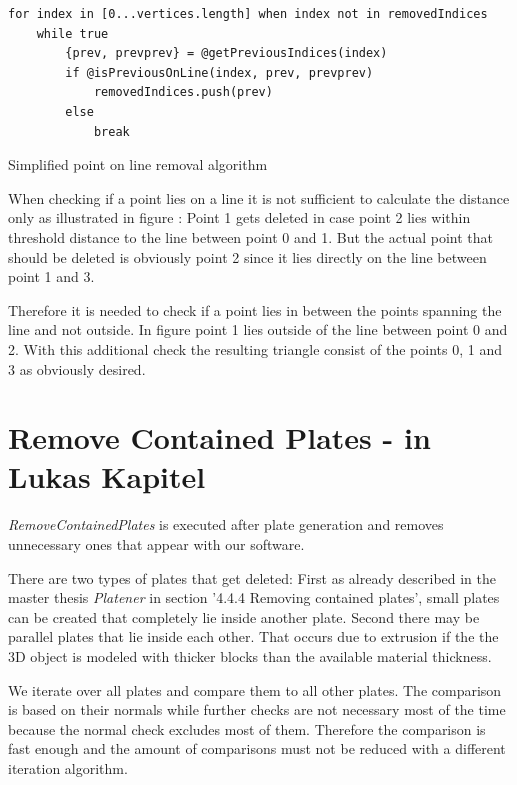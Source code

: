 \documentclass[../ClassicThesis.tex]{subfiles}
\begin{document}
\begin{listing}[!h]
\centering
\begin{verbatim}
for index in [0...vertices.length] when index not in removedIndices
    while true
        {prev, prevprev} = @getPreviousIndices(index)
        if @isPreviousOnLine(index, prev, prevprev)
            removedIndices.push(prev)
        else
            break
\end{verbatim}
\caption{Simplified point on line removal algorithm}
\label{lst:pointOnLineRemovalAlgo}
\end{listing}


When checking if a point lies on a line it is not sufficient to calculate the distance only as illustrated in figure : Point 1 gets deleted in case point 2 lies within threshold distance to the line between point 0 and 1. But the actual point that should be deleted is obviously point 2 since it lies directly on the line between point 1 and 3.

Therefore it is needed to check if a point lies in between the points spanning the line and not outside. In figure  point 1 lies outside of the line between point 0 and 2. With this additional check the resulting triangle consist of the points 0, 1 and 3 as obviously desired.










\section{Remove Contained Plates - in Lukas Kapitel}

\emph{RemoveContainedPlates} is executed after plate generation and removes unnecessary ones that appear with our software.

There are two types of plates that get deleted: First as already described in the master thesis \emph{Platener} \cite{master-thesis} in section '4.4.4 Removing contained plates', small plates can be created that completely lie inside another plate. Second there may be parallel plates that lie inside each other. That occurs due to extrusion if the the 3D object is modeled with thicker blocks than the available material thickness.

We iterate over all plates and compare them to all other plates. The comparison is based on their normals while further checks are not necessary most of the time because the normal check excludes most of them. Therefore the comparison is fast enough and the amount of comparisons must not be reduced with a different iteration algorithm.
\end{document}

